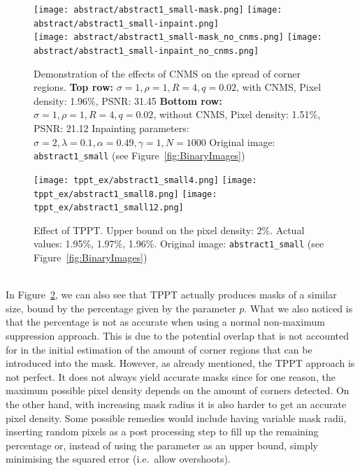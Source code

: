 \begin{figure}[h]
    \centering
    \texttt{[image: abstract/abstract1\_small-mask.png]}\hspace{0.2cm}
    \texttt{[image: abstract/abstract1\_small-inpaint.png]}\\
    \vspace*{0.2cm}
    \texttt{[image: abstract/abstract1\_small-mask\_no\_cnms.png]}\hspace{0.2cm}
    \texttt{[image: abstract/abstract1\_small-inpaint\_no\_cnms.png]}\\
    \caption{Demonstration of the effects of CNMS on the spread of corner regions.
\textbf{Top row:} $\sigma=1,\rho=1,R=4,q=0.02$, with CNMS, Pixel density: 1.96\%, PSNR\@:
31.45
\textbf{Bottom row:} $\sigma=1,\rho=1,R=4,q=0.02$, without CNMS, Pixel density:
1.51\%, PSNR\@: 21.12
Inpainting parameters: $\sigma=2,\lambda=0.1,\alpha=0.49,\gamma=1,N=1000$
Original image: \texttt{abstract1\_small} (see Figure~\ref{fig:BinaryImages})}\label{fig:AbstractCNMSExamples}
\end{figure}
\begin{figure}[ht]
    \centering
    \texttt{[image: tppt\_ex/abstract1\_small4.png]}
    \texttt{[image: tppt\_ex/abstract1\_small8.png]}
    \texttt{[image: tppt\_ex/abstract1\_small12.png]}
    \caption{Effect of TPPT\@. Upper bound on the pixel density: 2\%. Actual values:
        1.95\%, 1.97\%, 1.96\%. Original image: \texttt{abstract1\_small} (see
    Figure~\ref{fig:BinaryImages})}\label{fig:TPPTEx}
\end{figure}
\\\noindent In Figure~\ref{fig:TPPTEx}, we can also see that TPPT actually produces masks of a
similar size, bound by the percentage given by the parameter $p$. What we also noticed is that the
percentage is not as accurate when using a normal non-maximum suppression approach. This is due to
the potential overlap that is not accounted for in the initial estimation of the amount of corner
regions that can be introduced into the mask.
However, as already mentioned, the TPPT approach is not perfect.
It does not always yield accurate masks since for one
reason, the maximum possible pixel density depends on the amount of corners detected. On the other
hand, with increasing mask radius it is also harder to get an accurate pixel density. Some possible
remedies would include having variable mask radii, inserting random pixels as a post processing
step to fill up the
remaining percentage or, instead of using the parameter as an upper bound, simply minimising the
squared error (i.e.\ allow overshoots).
\newpage\noindent
